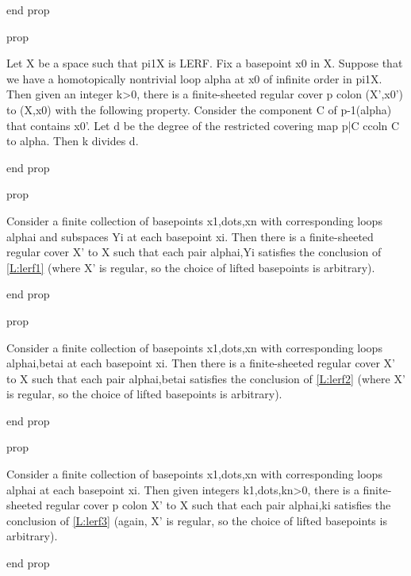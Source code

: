 end prop

prop

Let X be a space such that pi1X is LERF. Fix a basepoint x0 in X. Suppose that
we have a homotopically nontrivial loop alpha at x0 of infinite order in pi1X.
Then given an integer k>0, there is a finite-sheeted regular cover p colon
(X',x0') to (X,x0) with the following property. Consider the component C of
p-1(alpha) that contains x0'. Let d be the degree of the restricted covering
map p|C ccoln C to alpha. Then k divides d.

end prop

prop

Consider a finite collection of basepoints x1,dots,xn with corresponding loops
alphai and subspaces Yi at each basepoint xi. Then there is a finite-sheeted
regular cover X' to X such that each pair alphai,Yi satisfies the conclusion of
\ref{L:lerf1} (where X' is regular, so the choice of lifted basepoints is
arbitrary).

end prop

prop

Consider a finite collection of basepoints x1,dots,xn with corresponding loops
alphai,betai at each basepoint xi. Then there is a finite-sheeted regular cover
X' to X such that each pair alphai,betai satisfies the conclusion of
\ref{L:lerf2} (where X' is regular, so the choice of lifted basepoints is
arbitrary).

end prop

prop

Consider a finite collection of basepoints x1,dots,xn with corresponding loops
alphai at each basepoint xi. Then given integers k1,dots,kn>0, there is
a finite-sheeted regular cover p colon X' to X such that each pair alphai,ki
satisfies the conclusion of \ref{L:lerf3} (again, X' is regular, so the choice
of lifted basepoints is arbitrary).

end prop


